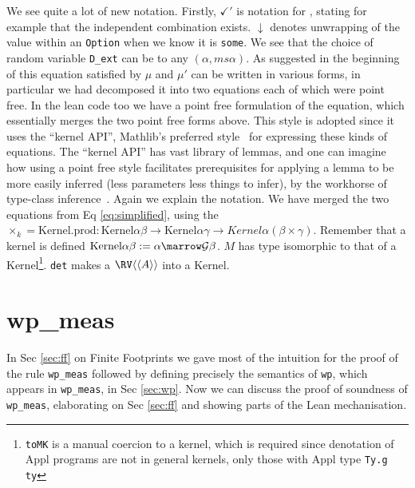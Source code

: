 We see quite a lot of new notation. Firstly, $\checkmark'$ is notation for , stating for example that the independent combination  exists.
$\downarrow$ denotes unwrapping of the value within an \texttt{Option} when we know it is \texttt{some}. We see that the choice of random variable \texttt{D\_ext} can be to any $(\alpha, ms\alpha)$.
As suggested in the beginning of this equation satisfied by $\mu$ and $\mu'$ can be written in various forms, in particular we had decomposed it into two equations each of which were point free.
In the lean code too we have a point free formulation of the equation, which essentially merges the two point free forms above. This style is adopted since it uses the
``kernel API'', Mathlib's preferred style~\citep{remy} for expressing these kinds of equations. The ``kernel API'' has vast library of lemmas, and one can imagine
how using a point free style facilitates prerequisites for applying a lemma to be more easily inferred (less parameters less things to infer), by the workhorse of type-class inference~\citep{spitters}.
Again we explain the notation. We have merged the two equations from Eq \ref{eq:simplified}, using the
$\times_k = \text{Kernel.prod} : \text{Kernel} \alpha \beta \to \text{Kernel} \alpha \gamma \to Kernel \alpha (\beta \times \gamma)$. Remember that a kernel is defined $\text{Kernel} \alpha \beta := \alpha \marrow \mathcal{G} \beta$.
$M$ has type isomorphic to that of a Kernel\footnote{\texttt{toMK} is a manual coercion to a kernel, which is required since denotation of Appl programs are not in general kernels, only those with Appl type \texttt{Ty.g ty}}.
\texttt{det} makes a $\RV \langle\langle A\rangle\rangle$ into a Kernel.

\section{wp\_meas}
\label{sec:wp-meas}

In Sec \ref{sec:ff} on Finite Footprints we gave most of the intuition for the proof of the rule \texttt{wp\_meas} followed by defining precisely the semantics of \texttt{wp}, which appears in
\texttt{wp\_meas}, in Sec \ref{sec:wp}. Now we can discuss the proof of soundness of \texttt{wp\_meas}, elaborating on Sec \ref{sec:ff} and showing parts of the Lean mechanisation.

